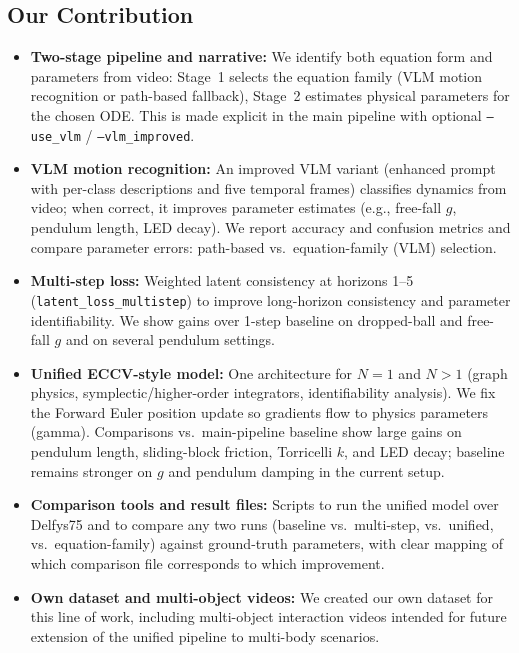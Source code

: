 \subsection{Our Contribution}
\begin{itemize}[leftmargin=1.5em]
    \item \textbf{Two-stage pipeline and narrative:} We identify both equation form and parameters from video: Stage~1 selects the equation family (VLM motion recognition or path-based fallback), Stage~2 estimates physical parameters for the chosen ODE. This is made explicit in the main pipeline with optional \texttt{--use\_vlm} / \texttt{--vlm\_improved}.
    \item \textbf{VLM motion recognition:} An improved VLM variant (enhanced prompt with per-class descriptions and five temporal frames) classifies dynamics from video; when correct, it improves parameter estimates (e.g., free-fall $g$, pendulum length, LED decay). We report accuracy and confusion metrics and compare parameter errors: path-based vs.\ equation-family (VLM) selection.
    \item \textbf{Multi-step loss:} Weighted latent consistency at horizons 1--5 (\texttt{latent\_loss\_multistep}) to improve long-horizon consistency and parameter identifiability. We show gains over 1-step baseline on dropped-ball and free-fall $g$ and on several pendulum settings.
    \item \textbf{Unified ECCV-style model:} One architecture for $N=1$ and $N>1$ (graph physics, symplectic/higher-order integrators, identifiability analysis). We fix the Forward Euler position update so gradients flow to physics parameters (gamma). Comparisons vs.\ main-pipeline baseline show large gains on pendulum length, sliding-block friction, Torricelli $k$, and LED decay; baseline remains stronger on $g$ and pendulum damping in the current setup.
    \item \textbf{Comparison tools and result files:} Scripts to run the unified model over Delfys75 and to compare any two runs (baseline vs.\ multi-step, vs.\ unified, vs.\ equation-family) against ground-truth parameters, with clear mapping of which comparison file corresponds to which improvement.
    \item \textbf{Own dataset and multi-object videos:} We created our own dataset for this line of work, including multi-object interaction videos intended for future extension of the unified pipeline to multi-body scenarios.
\end{itemize}

